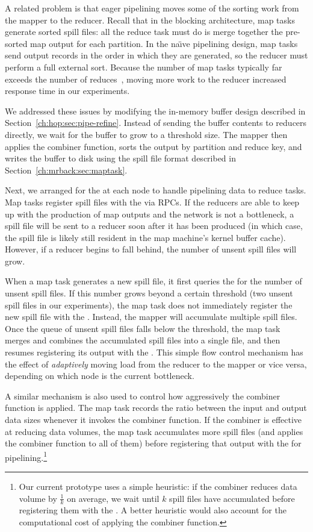 A related problem is that eager pipelining moves some of the sorting
work from the mapper to the reducer. Recall that in the blocking
architecture, map tasks generate sorted spill files: all the reduce
task must do is merge together the pre-sorted map output for each
partition. In the na\"{\i}ve pipelining design, map tasks send output
records in the order in which they are generated, so the reducer must
perform a full external sort. Because the number of map tasks
typically far exceeds the number of reduces~\cite{mapreduce-osdi},
moving more work to the reducer increased response time in our
experiments.

We addressed these issues by modifying the in-memory buffer design described in
Section~\ref{ch:hop:sec:pipe-refine}. Instead of sending the buffer contents to
reducers directly, we wait for the buffer to grow to a threshold
size. The mapper then applies the combiner function, sorts the output by
partition and reduce key, and writes the buffer to disk using the spill file
format described in Section~\ref{ch:mrback:sec:maptask}.

Next, we arranged for the {\TT} at each node to handle pipelining data to reduce
tasks. Map tasks register spill files with the {\TT} via RPCs. If the reducers
are able to keep up with the production of map outputs and the network is not a
bottleneck, a spill file will be sent to a reducer soon after it has been
produced (in which case, the spill file is likely still resident in the map
machine's kernel buffer cache). However, if a reducer begins to fall behind, the
number of unsent spill files will grow.

When a map task generates a new spill file, it first queries the {\TT} for the
number of unsent spill files. If this number grows beyond a certain threshold
(two unsent spill files in our experiments), the map task does not immediately
register the new spill file with the {\TT}. Instead, the mapper will accumulate
multiple spill files. Once the queue of unsent spill files falls below the
threshold, the map task merges and combines the accumulated spill files into a
single file, and then resumes registering its output with the {\TT}. This simple
flow control mechanism has the effect of \emph{adaptively} moving load from the
reducer to the mapper or vice versa, depending on which node is the current
bottleneck.

A similar mechanism is also used to control how aggressively the combiner
function is applied. The map task records the ratio between the input and output
data sizes whenever it invokes the combiner function. If the combiner is
effective at reducing data volumes, the map task accumulates more spill files
(and applies the combiner function to all of them) before registering that
output with the {\TT} for pipelining.\footnote{Our current prototype uses a
  simple heuristic: if the combiner reduces data volume by $\frac{1}{k}$ on
  average, we wait until $k$ spill files have accumulated before registering
  them with the {\TT}. A better heuristic would also account for the computational
  cost of applying the combiner function.}

